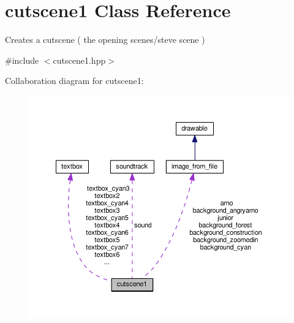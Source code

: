 \hypertarget{classcutscene1}{}\section{cutscene1 Class Reference}
\label{classcutscene1}


Creates a cutscene ( the opening scenes/steve scene )  




{\ttfamily \#include $<$cutscene1.\+hpp$>$}



Collaboration diagram for cutscene1\+:\nopagebreak
\begin{figure}[H]
\begin{center}
\leavevmode
\includegraphics[width=350pt]{classcutscene1__coll__graph}
\end{center}
\end{figure}
